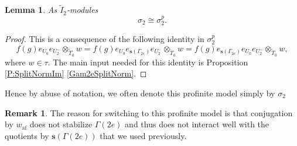 \documentclass[10pt, letterpaper]{amsart}
\theoremstyle{plain}
\newtheorem{Lem}[equation]{Lemma}
\theoremstyle{definition}
\newtheorem*{Rmk}{Remark}
\numberwithin{equation}{section}
\newcommand{\It}{\widetilde{I}}
\newcommand{\Tt}{\widetilde{T}}
\newcommand{\Hom}{\operatorname{Hom}}
\newcommand{\af}{\mathrm{af}}
\newcommand{\s}{\mathbf{s}}
\newcommand{\qand}{{\quad\text{and}\quad}}
\begin{document}
\begin{Lem}
As $\It_2$-modules 
\[
\sigma_{2}\cong\sigma_{2}^{p}.
\]
\end{Lem}
\begin{proof}
This is a consequence of the following identity in $\sigma_{2}^{p}$
    \begin{equation*}
        f(g)e_{U_{0}}e_{U^{-}_{2}}\otimes_{\Tt_{0}}w=f(g)e_{U_{0}}e_{\textbf{s}(\Gamma_{2e})}e_{U^{-}_{2}}\otimes_{\Tt_{0}}w=f(g)e_{\textbf{s}(\Gamma_{2e})}e_{U_{0}}e_{U^{-}_{2}}\otimes_{\Tt_{0}}w,
    \end{equation*}
where $w\in\tau$. The main input needed for this identity is Proposition \ref{P:SplitNormIm} \eqref{Gam2eSplitNorm}.
\end{proof}

Hence by abuse of notation, we often denote this profinite model simply by $\sigma_2$

\begin{Rmk}
The reason for switching to this profinite model is that conjugation by $w_{\af}$ does not stabilize $\Gamma(2e)$ and thus does not interact well with the quotients by $\s(\Gamma(2e))$ that we used previously.
\end{Rmk}

\end{document}
